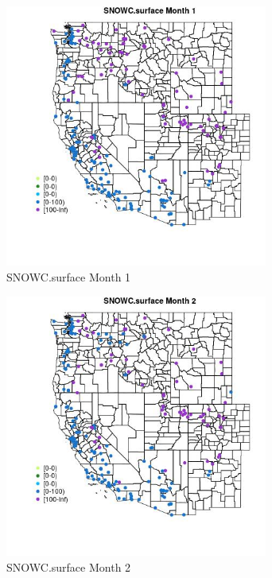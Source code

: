 \begin{figure} 
\centering  
\includegraphics[width=0.77\textwidth]{Code_Outputs/Report_ML_input_PM25_Step4_part_e_de_duplicated_aveswNAs_MapObsMo1SNOWCsurface.jpg} 
\caption{\label{fig:Report_ML_input_PM25_Step4_part_e_de_duplicated_aveswNAsMapObsMo1SNOWCsurface}SNOWC.surface Month 1} 
\end{figure} 
 

\clearpage 

\begin{figure} 
\centering  
\includegraphics[width=0.77\textwidth]{Code_Outputs/Report_ML_input_PM25_Step4_part_e_de_duplicated_aveswNAs_MapObsMo2SNOWCsurface.jpg} 
\caption{\label{fig:Report_ML_input_PM25_Step4_part_e_de_duplicated_aveswNAsMapObsMo2SNOWCsurface}SNOWC.surface Month 2} 
\end{figure} 
 


